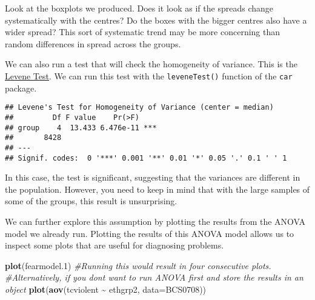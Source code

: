 \documentclass[
]{book}
\newenvironment{Shaded}{\begin{snugshade}}{\end{snugshade}}
\newcommand{\AttributeTok}[1]{\textcolor[rgb]{0.13,0.29,0.53}{#1}}
\newcommand{\CommentTok}[1]{\textcolor[rgb]{0.56,0.35,0.01}{\textit{#1}}}
\newcommand{\FloatTok}[1]{\textcolor[rgb]{0.00,0.00,0.81}{#1}}
\newcommand{\FunctionTok}[1]{\textcolor[rgb]{0.13,0.29,0.53}{\textbf{#1}}}
\newcommand{\NormalTok}[1]{#1}
\newcommand{\SpecialCharTok}[1]{\textcolor[rgb]{0.81,0.36,0.00}{\textbf{#1}}}
\begin{document}
Look at the boxplots we produced. Does it look as if the spreads change systematically with the centres? Do the boxes with the bigger centres also have a wider spread? This sort of systematic trend may be more concerning than random differences in spread across the groups.

We can also run a test that will check the homogeneity of variance. This is the \href{http://en.wikipedia.org/wiki/Levene's_test}{Levene Test}. We can run this test with the \texttt{leveneTest()} function of the \texttt{car} package.

\begin{Shaded}
\end{Shaded}

\begin{verbatim}
## Levene's Test for Homogeneity of Variance (center = median)
##         Df F value    Pr(>F)    
## group    4  13.433 6.476e-11 ***
##       8428                      
## ---
## Signif. codes:  0 '***' 0.001 '**' 0.01 '*' 0.05 '.' 0.1 ' ' 1
\end{verbatim}

In this case, the test is significant, suggesting that the variances are different in the population. However, you need to keep in mind that with the large samples of some of the groups, this result is unsurprising.

We can further explore this assumption by plotting the results from the ANOVA model we already run. Plotting the results of this ANOVA model allows us to inspect some plots that are useful for diagnosing problems.

\begin{Shaded}
\begin{Highlighting}[]
\FunctionTok{plot}\NormalTok{(fearmodel}\FloatTok{.1}\NormalTok{) }\CommentTok{\#Running this would result in four consecutive plots.}
\CommentTok{\#Alternatively, if you don\textquotesingle{}t want to run ANOVA first and store the results in an object}
\FunctionTok{plot}\NormalTok{(}\FunctionTok{aov}\NormalTok{(tcviolent }\SpecialCharTok{\textasciitilde{}}\NormalTok{ ethgrp2, }\AttributeTok{data=}\NormalTok{BCS0708))}
\end{Highlighting}
\end{Shaded}
\end{document}
